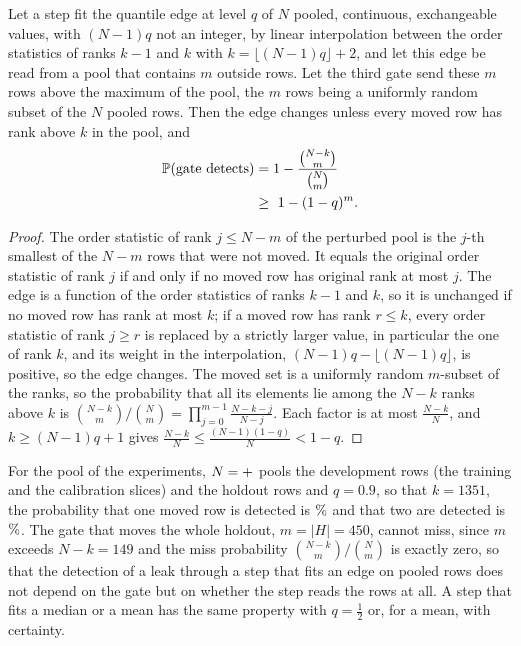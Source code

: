 \begin{proposition}
\label{prop:detection}
Let a step fit the quantile edge at level $q$ of $N$ pooled, continuous, exchangeable values, with $(N-1)q$ not an integer, by linear interpolation between the order statistics of ranks $k-1$ and $k$ with $k=\lfloor(N-1)q\rfloor+2$, and let this edge be read from a pool that contains $m$ outside rows. Let the third gate send these $m$ rows above the maximum of the pool, the $m$ rows being a uniformly random subset of the $N$ pooled rows. Then the edge changes unless every moved row has rank above $k$ in the pool, and
\begin{equation}
\begin{split}
\mathbb{P}(\text{gate detects})&=1-\frac{\binom{N-k}{m}}{\binom{N}{m}}\\
&\ge\ 1-(1-q)^m .
\end{split}
\label{eq:detect}
\end{equation}
\end{proposition}
\begin{proof}
The order statistic of rank $j\le N-m$ of the perturbed pool is the $j$-th smallest of the $N-m$ rows that were not moved. It equals the original order statistic of rank $j$ if and only if no moved row has original rank at most $j$. The edge is a function of the order statistics of ranks $k-1$ and $k$, so it is unchanged if no moved row has rank at most $k$; if a moved row has rank $r\le k$, every order statistic of rank $j\ge r$ is replaced by a strictly larger value, in particular the one of rank $k$, and its weight in the interpolation, $(N-1)q-\lfloor(N-1)q\rfloor$, is positive, so the edge changes. The moved set is a uniformly random $m$-subset of the ranks, so the probability that all its elements lie among the $N-k$ ranks above $k$ is $\binom{N-k}{m}/\binom{N}{m}=\prod_{j=0}^{m-1}\frac{N-k-j}{N-j}$. Each factor is at most $\frac{N-k}{N}$, and $k\ge(N-1)q+1$ gives $\frac{N-k}{N}\le\frac{(N-1)(1-q)}{N}<1-q$.
\end{proof}
For the pool of the experiments, $N=\nv{th.det.ntrain}+\nv{th.det.nout}$ pools the development rows (the training and the calibration slices) and the holdout rows and $q=0.9$, so that $k=1351$, the probability that one moved row is detected is $\nv{th.det.1.exact}\%$ and that two are detected is $\nv{th.det.2.exact}\%$. The gate that moves the whole holdout, $m=|H|=450$, cannot miss, since $m$ exceeds $N-k=149$ and the miss probability $\binom{N-k}{m}/\binom{N}{m}$ is exactly zero, so that the detection of a leak through a step that fits an edge on pooled rows does not depend on the gate but on whether the step reads the rows at all. A step that fits a median or a mean has the same property with $q=\frac12$ or, for a mean, with certainty.

